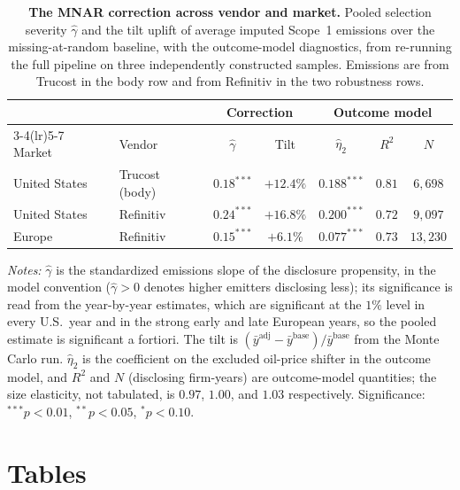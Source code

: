 \documentclass[a4paper,12pt]{article}
\begin{document}
\begin{table}[htbp]
\footnotesize\centering
\caption{\textbf{The MNAR correction across vendor and market.} Pooled selection
severity $\hat\gamma$ and the tilt uplift of average imputed Scope~1 emissions over
the missing-at-random baseline, with the outcome-model diagnostics, from re-running
the full pipeline on three independently constructed samples. Emissions are from
Trucost in the body row and from Refinitiv in the two robustness rows.}
\label{tab:vendor_market_robustness}
\begin{tabular}{ll cc ccc}
\toprule
 & & \multicolumn{2}{c}{Correction} & \multicolumn{3}{c}{Outcome model} \\
\cmidrule(lr){3-4}\cmidrule(lr){5-7}
Market & Vendor & $\hat\gamma$ & Tilt & $\hat\eta_2$ & $R^2$ & $N$ \\
\midrule
United States & Trucost (body) & $0.18^{***}$ & $+12.4\%$ & $0.188^{***}$ & $0.81$ & $6{,}698$ \\
United States & Refinitiv      & $0.24^{***}$ & $+16.8\%$ & $0.200^{***}$ & $0.72$ & $9{,}097$ \\
Europe        & Refinitiv      & $0.15^{***}$ & $+6.1\%$  & $0.077^{***}$ & $0.73$ & $13{,}230$ \\
\bottomrule
\end{tabular}
\begin{flushleft}\footnotesize
\textit{Notes:} $\hat\gamma$ is the standardized emissions slope of the disclosure
propensity, in the model convention ($\hat\gamma>0$ denotes higher emitters
disclosing less); its significance is read from the year-by-year estimates, which
are significant at the $1\%$ level in every U.S.\ year and in the strong early and
late European years, so the pooled estimate is significant a fortiori. The tilt is
$(\bar{y}^{\text{adj}} - \bar{y}^{\text{base}})/\bar{y}^{\text{base}}$ from the Monte
Carlo run. $\hat\eta_2$ is the coefficient on the excluded oil-price shifter in the
outcome model, and $R^2$ and $N$ (disclosing firm-years) are outcome-model
quantities; the size elasticity, not tabulated, is $0.97$, $1.00$, and $1.03$
respectively. Significance: $^{***}p<0.01$, $^{**}p<0.05$, $^{*}p<0.10$.
\end{flushleft}
\end{table}

\clearpage

\section{Tables}
\label{app:data}
\end{document}

